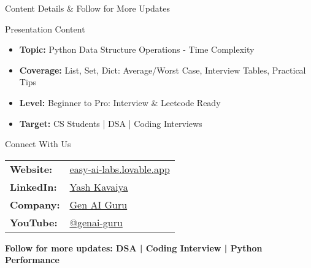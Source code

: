 \documentclass[aspectratio=169]{beamer}
\begin{document}
{
\begin{frame}{Content Details \& Follow for More Updates}
\begin{block}{Presentation Content}
\begin{itemize}
\item \textbf{Topic:} Python Data Structure Operations - Time Complexity
\item \textbf{Coverage:} List, Set, Dict: Average/Worst Case, Interview Tables, Practical Tips
\item \textbf{Level:} Beginner to Pro: Interview & Leetcode Ready
\item \textbf{Target:} CS Students | DSA | Coding Interviews
\end{itemize}
\end{block}
\begin{block}{Connect With Us}
\centering
\begin{tabular}{ll}
\textcolor{GoogleBlue}{\textbf{Website:}} & \href{https://easy-ai-labs.lovable.app/}{easy-ai-labs.lovable.app} \\
\textcolor{GoogleRed}{\textbf{LinkedIn:}} & \href{https://www.linkedin.com/in/yashkavaiya}{Yash Kavaiya} \\
\textcolor{GoogleGreen}{\textbf{Company:}} & \href{https://www.linkedin.com/company/genai-guru}{Gen AI Guru} \\
\textcolor{GoogleYellow!80!black}{\textbf{YouTube:}} & \href{https://www.youtube.com/@genai-guru}{@genai-guru} \\
\end{tabular}
\end{block}
\begin{center}
\colorbox{GoogleBlue!15}{
\begin{minipage}{11cm}
\centering
\textbf{Follow for more updates: DSA | Coding Interview | Python Performance}
\end{minipage}
}
\end{center}
\end{frame}
}
\end{document}
